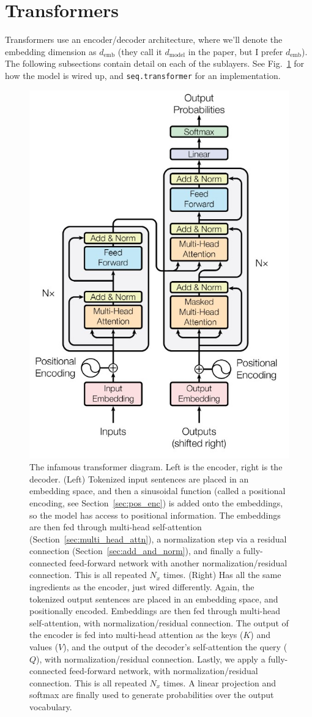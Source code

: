 \documentclass[11pt]{article}
\numberwithin{equation}{section}
\begin{document}
\newcommand{\demb}{d_{\text{emb}}}

\section{Transformers}

Transformers \citep{Vaswani17} use an encoder/decoder architecture, where we'll denote the embedding dimension as $\demb$ (they call it $d_{\text{model}}$ in the paper, but I prefer $\demb$). The following subsections contain detail on each of the sublayers. See Fig.~\ref{fig:tfm} for how the model is wired up, and \verb+seq.transformer+ for an implementation.

\begin{figure}
\begin{center}
\includegraphics[width=0.4\columnwidth]{../figures/transformer.jpg}  
\end{center}
\caption{The infamous transformer diagram. Left is the encoder, right is the decoder. (Left) Tokenized input sentences are placed in an embedding space, and then a sinusoidal function (called a positional encoding, see Section~\ref{sec:pos_enc}) is added onto the embeddings, so the model has access to positional information. The embeddings are then fed through multi-head self-attention (Section~\ref{sec:multi_head_attn}), a normalization step via a residual connection (Section~\ref{sec:add_and_norm}), and finally a fully-connected feed-forward network with another normalization/residual connection. This is all repeated $N_x$ times. (Right) Has all the same ingredients as the encoder, just wired differently. Again, the tokenized output sentences are placed in an embedding space, and positionally encoded. Embeddings are then fed through multi-head self-attention, with normalization/residual connection. The output of the encoder is fed into multi-head attention as the keys ($K$) and values ($V$), and the output of the decoder's self-attention the query ($Q$), with normalization/residual connection. Lastly, we apply a fully-connected feed-forward network, with normalization/residual connection. This is all repeated $N_x$ times. A linear projection and softmax are finally used to generate probabilities over the output vocabulary.}
\label{fig:tfm}
\end{figure}
\end{document}
